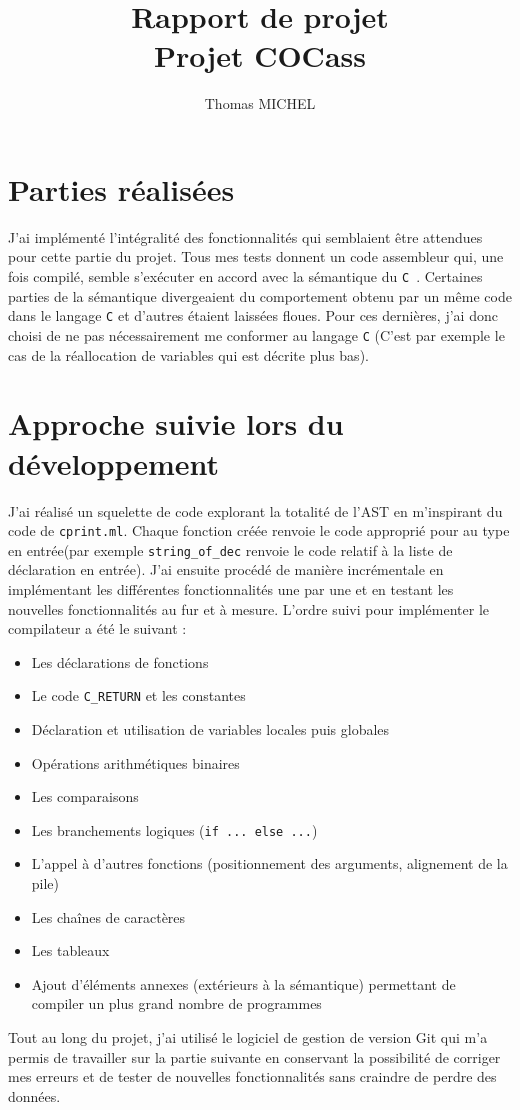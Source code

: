 \documentclass[11pt]{article}
\title{Rapport de projet \\ Projet COCass}
\author{Thomas MICHEL}
\newcommand{\Cmm}{\texttt{C\textminus\textminus\ }}
\newcommand{\ttt}[1]{\texttt{#1}}
\begin{document}
\maketitle
\section{Parties réalisées}
J'ai implémenté l'intégralité des fonctionnalités qui semblaient être attendues pour cette partie du projet.
Tous mes tests donnent un code assembleur qui, une fois compilé, semble s'exécuter en accord avec la sémantique du \Cmm.
Certaines parties de la sémantique divergeaient du comportement obtenu par un même code dans le langage \ttt{C} et d'autres étaient laissées floues.
Pour ces dernières, j'ai donc choisi de ne pas nécessairement me conformer au langage \ttt{C} (C'est par exemple le cas de la réallocation de variables qui est décrite plus bas).

\section{Approche suivie lors du développement}
J'ai réalisé un squelette de code explorant la totalité de l'AST en m'inspirant du code de \texttt{cprint.ml}.
Chaque fonction créée renvoie le code approprié pour au type en entrée(par exemple \texttt{string\_of\_dec} renvoie le code relatif à la liste de déclaration en entrée).
J'ai ensuite procédé de manière incrémentale en implémentant les différentes fonctionnalités une par une et en testant les nouvelles fonctionnalités au fur et à mesure.
L'ordre suivi pour implémenter le compilateur a été le suivant :
\begin{itemize}
    \item Les déclarations de fonctions
    \item Le code \texttt{C\_RETURN} et les constantes
    \item Déclaration et utilisation de variables locales puis globales
    \item Opérations arithmétiques binaires
    \item Les comparaisons
    \item Les branchements logiques (\texttt{if ... else ...})
    \item L'appel à d'autres fonctions (positionnement des arguments, alignement de la pile)
    \item Les chaînes de caractères
    \item Les tableaux
    \item Ajout d'éléments annexes (extérieurs à la sémantique) permettant de compiler un plus grand nombre de programmes
\end{itemize}
Tout au long du projet, j'ai utilisé le logiciel de gestion de version Git qui m'a permis de travailler sur la partie suivante en conservant la possibilité de corriger mes erreurs et de tester de nouvelles fonctionnalités sans craindre de perdre des données.
\end{document}
